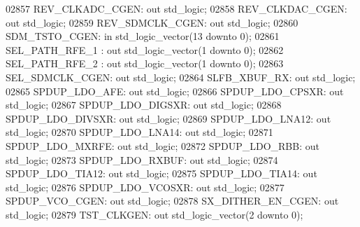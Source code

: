 \begin{DoxyCode}
02857     REV\_CLKADC\_CGEN: \textcolor{keywordflow}{out} \textcolor{comment}{std\_logic};
02858     REV\_CLKDAC\_CGEN: \textcolor{keywordflow}{out} \textcolor{comment}{std\_logic};
02859     REV\_SDMCLK\_CGEN:    \textcolor{keywordflow}{out} \textcolor{comment}{std\_logic};
02860     SDM\_TSTO\_CGEN:  \textcolor{keywordflow}{in} \textcolor{comment}{std\_logic\_vector}(\textcolor{vhdllogic}{}\textcolor{vhdllogic}{13} \textcolor{keywordflow}{downto} \textcolor{vhdllogic}{}\textcolor{vhdllogic}{0});   
02861     SEL\_PATH\_RFE\_1    : \textcolor{keywordflow}{out} \textcolor{comment}{std\_logic\_vector}(\textcolor{vhdllogic}{}\textcolor{vhdllogic}{1} \textcolor{keywordflow}{downto} \textcolor{vhdllogic}{}\textcolor{vhdllogic}{0});
02862     SEL\_PATH\_RFE\_2    : \textcolor{keywordflow}{out} \textcolor{comment}{std\_logic\_vector}(\textcolor{vhdllogic}{}\textcolor{vhdllogic}{1} \textcolor{keywordflow}{downto} \textcolor{vhdllogic}{}\textcolor{vhdllogic}{0});
02863     SEL\_SDMCLK\_CGEN:    \textcolor{keywordflow}{out} \textcolor{comment}{std\_logic};
02864     SLFB\_XBUF\_RX:   \textcolor{keywordflow}{out} \textcolor{comment}{std\_logic};
02865     SPDUP\_LDO\_AFE:  \textcolor{keywordflow}{out} \textcolor{comment}{std\_logic};
02866     SPDUP\_LDO\_CPSXR:    \textcolor{keywordflow}{out} \textcolor{comment}{std\_logic};
02867     SPDUP\_LDO\_DIGSXR:   \textcolor{keywordflow}{out} \textcolor{comment}{std\_logic};
02868     SPDUP\_LDO\_DIVSXR:   \textcolor{keywordflow}{out} \textcolor{comment}{std\_logic};
02869     SPDUP\_LDO\_LNA12:    \textcolor{keywordflow}{out} \textcolor{comment}{std\_logic};
02870     SPDUP\_LDO\_LNA14:    \textcolor{keywordflow}{out} \textcolor{comment}{std\_logic};
02871     SPDUP\_LDO\_MXRFE:    \textcolor{keywordflow}{out} \textcolor{comment}{std\_logic};
02872     SPDUP\_LDO\_RBB:  \textcolor{keywordflow}{out} \textcolor{comment}{std\_logic};
02873     SPDUP\_LDO\_RXBUF:    \textcolor{keywordflow}{out} \textcolor{comment}{std\_logic};
02874     SPDUP\_LDO\_TIA12:    \textcolor{keywordflow}{out} \textcolor{comment}{std\_logic};
02875     SPDUP\_LDO\_TIA14:    \textcolor{keywordflow}{out} \textcolor{comment}{std\_logic};
02876     SPDUP\_LDO\_VCOSXR:   \textcolor{keywordflow}{out} \textcolor{comment}{std\_logic};
02877     SPDUP\_VCO\_CGEN: \textcolor{keywordflow}{out} \textcolor{comment}{std\_logic};
02878     SX\_DITHER\_EN\_CGEN:  \textcolor{keywordflow}{out} \textcolor{comment}{std\_logic};
02879     TST\_CLKGEN: \textcolor{keywordflow}{out} \textcolor{comment}{std\_logic\_vector}(\textcolor{vhdllogic}{}\textcolor{vhdllogic}{2} \textcolor{keywordflow}{downto} \textcolor{vhdllogic}{}\textcolor{vhdllogic}{0});

\end{DoxyCode}
